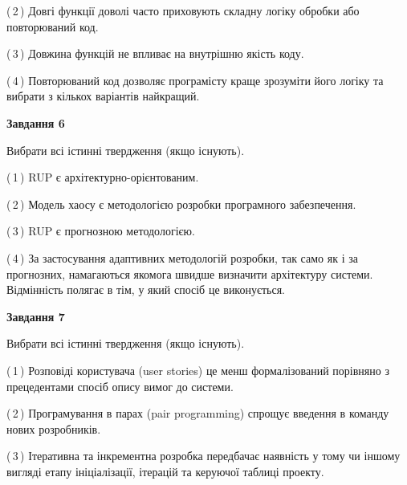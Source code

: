 \documentclass[10pt, ukrainian]{article}
\begin{document}
{\begin {large}
(\,2\,) Довгі функції доволі часто приховують складну логіку обробки або повторюваний код. %



(\,3\,) Довжина функцій не впливає на внутрішню якість коду. %



(\,4\,) Повторюваний код дозволяє програмісту краще зрозуміти його логіку та вибрати з кількох варіантів найкращий. %

\newpage

{\begin {center}\textbf{Завдання 6}\end {center}}\par
Вибрати всі істинні твердження (якщо існують).\par
\vspace{2mm}



(\,1\,) RUP є архітектурно-орієнтованим. %



(\,2\,) Модель хаосу є методологією розробки програмного забезпечення. %



(\,3\,) RUP є прогнозною методологією. %



(\,4\,) За застосування адаптивних методологій розробки, так само як і за прогнозних, намагаються якомога швидше визначити архітектуру системи. Відмінність полягає в тім, у який спосіб це виконується.%


{\begin {center}\textbf{Завдання 7}\end {center}}\par
Вибрати всі істинні твердження (якщо існують).\par
\vspace{2mm}



(\,1\,) Розповіді користувача (user stories) це менш формалізований порівняно з прецедентами спосіб опису вимог до системи. %



(\,2\,) Програмування в парах (pair programming) спрощує введення в команду нових розробників. %



(\,3\,) Ітеративна та інкрементна розробка передбачає наявність у тому чи іншому вигляді етапу ініціалізації, ітерацій та керуючої таблиці проекту. %




\end{large}}
\end{document}
